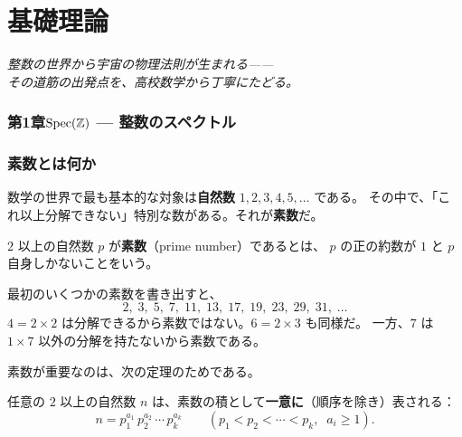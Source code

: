 
\part*{基礎理論}

\vspace{-1em}
\begin{center}
\textit{整数の世界から宇宙の物理法則が生まれる——\\
その道筋の出発点を、高校数学から丁寧にたどる。}
\end{center}
\vspace{1em}

\section*{第1章\quad $\operatorname{Spec}(\mathbb{Z})$ — 整数のスペクトル}

\section{素数とは何か}
\label{sec:1.1}

数学の世界で最も基本的な対象は\textbf{自然数} $1, 2, 3, 4, 5, \ldots$ である。
その中で、「これ以上分解できない」特別な数がある。それが\textbf{素数}だ。

\begin{dfnbox}[定義: 素数]
$2$ 以上の自然数 $p$ が\textbf{素数}（prime number）であるとは、
$p$ の正の約数が $1$ と $p$ 自身しかないことをいう。
\end{dfnbox}

最初のいくつかの素数を書き出すと、
\[
  2,\; 3,\; 5,\; 7,\; 11,\; 13,\; 17,\; 19,\; 23,\; 29,\; 31,\; \ldots
\]
$4 = 2\times 2$ は分解できるから素数ではない。$6 = 2\times 3$ も同様だ。
一方、$7$ は $1\times 7$ 以外の分解を持たないから素数である。

素数が重要なのは、次の定理のためである。

\begin{keybox}[算術の基本定理]
任意の $2$ 以上の自然数 $n$ は、素数の積として\textbf{一意に}（順序を除き）表される：
\[
  n = p_1^{a_1}\, p_2^{a_2}\, \cdots\, p_k^{a_k}
  \qquad (p_1 < p_2 < \cdots < p_k,\;\; a_i \geq 1).
\]
\end{keybox}

